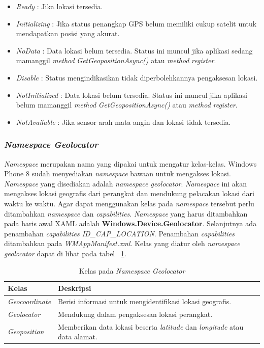 \begin{itemize}
	\item \textit{Ready} : Jika lokasi tersedia.
	\item \textit{Initializing} : Jika status penangkap GPS belum memiliki cukup satelit untuk mendapatkan posisi yang akurat. 
	\item \textit{NoData} : Data lokasi belum tersedia. Status ini muncul jika aplikasi sedang mamanggil \textit{method} \textit{GetGeopositionAsync()} atau \textit{method} \textit{register}.
	\item \textit{Disable} : Status mengindikasikan tidak diperbolehkannya pengaksesan lokasi.
	\item \textit{NotInitialized} : Data lokasi belum tersedia. Status ini muncul jika aplikasi belum mamanggil \textit{method} \textit{GetGeopositionAsync()} atau \textit{method} \textit{register}.
	\item \textit{NotAvailable} : Jika sensor arah mata angin dan lokasi tidak tersedia.
\end{itemize}

\subsubsection{\textit{Namespace Geolocator}}
\label{subsubsec:Namespace Geolocator}
\hspace{0.5cm} \textit{Namespace} merupakan nama yang dipakai untuk mengatur kelas-kelas. Windows Phone 8 sudah menyediakan \textit{namespace} bawaan untuk mengakses lokasi. \textit{Namespace} yang disediakan adalah \textit{namespace geolocator}. \textit{Namespace} ini akan mengakses lokasi geografis dari perangkat dan mendukung pelacakan lokasi dari waktu ke waktu. Agar dapat menggunakan kelas pada \textit{namespace} tersebut perlu ditambahkan \textit{namespace} dan \textit{capabilities}. \textit{Namespace} yang harus ditambahkan pada baris awal XAML adalah \textbf{Windows.Device.Geolocator}. Selanjutnya ada penambahan \textit{capabilities ID\_CAP\_LOCATION}. Penambahan \textit{capabilities} ditambahkan pada \textit{WMAppManifest.xml}. Kelas yang diatur oleh \textit{namespace geolocator} dapat di lihat pada tabel ~\ref{tab:KelasPadaNamespaceGeolocator}\cite{DevWP8}.
\begin{table}[h]
	\centering
		\begin{tabular}{ |p{4cm}|p{10cm}|}
				\hline
				Kelas & Deskripsi \\ \hline
				\textit{Geocoordinate} & Berisi informasi untuk mengidentifikasi lokasi geografis. \\ \hline
				\textit{Geolocator} & Mendukung dalam pengaksesan lokasi perangkat. \\ \hline
				\textit{Geoposition} & Memberikan data lokasi beserta \textit{latitude} dan \textit{longitude} atau data alamat. \\ \hline
				\hline
		\end{tabular}
	\caption{Kelas pada \textit{Namespace Geolocator}}
	\label{tab:KelasPadaNamespaceGeolocator}
\end{table}

